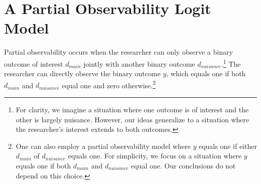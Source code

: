 \documentclass[10pt]{article}
\begin{document}
\section*{A Partial Observability Logit Model}

Partial observability occurs when the researcher can only observe a binary outcome of interest $d_{main}$ jointly with another binary outcome $d_{nuisance}$.\footnote{For clarity, we imagine a situation where one outcome is of interest and the other is largely nuisance. 
However, our ideas generalize to a situation where the researcher's interest extends to both outcomes.}
The researcher can directly observe the binary outcome $y$, which equals one if both $d_{main}$ and $d_{nuisance}$ equal one and zero otherwise.\footnote{One can also employ a partial observability model where $y$ equals one if either $d_{main}$ of $d_{nuisance}$ equals one. 
For simplicity, we focus on a situation where $y$ equals one if both $d_{main}$ and $d_{nuisance}$ equal one. 
Our conclusions do not depend on this choice.}
\end{document}
